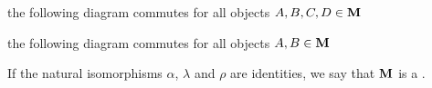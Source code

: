 \begin{definition}
\begin{defenum}
    \item the following diagram commutes for all objects \( A, B, C, D \in \operatorname{\mathbf{M}} \)
    \begin{Center}
    \end{Center}

    \item the following diagram commutes for all objects \( A, B \in \operatorname{\mathbf{M}} \)
    \begin{Center}
    \end{Center}
  \end{defenum}

  If the natural isomorphisms \( \alpha \), \( \lambda \) and \( \rho \) are identities, we say that \( \operatorname{\mathbf{M}} \) is a .
\end{definition}


